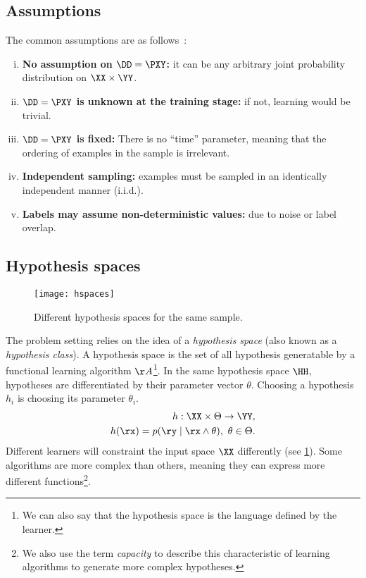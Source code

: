 \subsection{Assumptions}\label{mlt_assumptions} The common assumptions are as follows~\cite{mello:2018, luxburg:2011}:
\begin{enumerate}
	[i.]
	\item \textbf{No assumption on \(\DD=\PXY\): } it can be any arbitrary joint probability distribution on \(\XX \times \YY\).\label{distribution-free}
	\item \textbf{\(\DD=\PXY\) is unknown at the training stage:} if not, learning would be trivial.
	\item \textbf{\(\DD=\PXY\) is fixed:} There is no ``time'' parameter, meaning that the ordering of examples in the sample is irrelevant\label{no-time}.
	\item \textbf{Independent sampling:} examples must be sampled in an identically independent manner (i.i.d.).\label{independent_sampling}
	\item \textbf{Labels may assume non-deterministic values:} due to noise or label overlap.
\end{enumerate}

\subsection{Hypothesis spaces}\label{hypothesis_space}
\begin{figure}
	[ht!] \centering
	\texttt{[image: hspaces]}
	\caption{Different hypothesis spaces for the same sample.}\label{fig:hypothesis_spaces}
\end{figure}
The problem setting relies on the idea of a \emph{hypothesis space} (also known as a \emph{hypothesis class}). A hypothesis space is the set of all hypothesis generatable by a functional learning algorithm \( \AA\)\footnote{We can also say that the hypothesis space is the language defined by the learner.}. In the same hypothesis space \(\HH\), hypotheses are differentiated by their parameter vector \(\theta\). Choosing a hypothesis \(h_i\) is choosing its parameter \(\theta_i\).
\begin{align}
	h: \XX \times \Theta \to \YY, \\
	h(\rx) = p(\ry \mid \rx \land \theta),~ \theta \in \Theta.
\end{align}
Different learners will constraint the input space \(\XX\) differently (see \cref{fig:hypothesis_spaces}). Some algorithms are more complex than others, meaning they can express more different functions\footnote{We also use the term \emph{capacity} to describe this characteristic of learning algorithms to generate more complex hypotheses.}.

